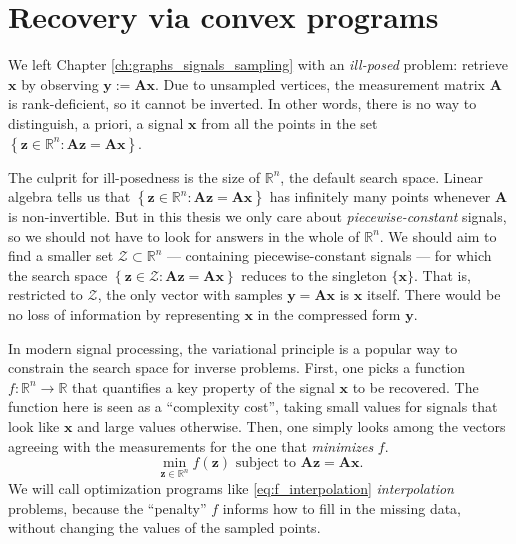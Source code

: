 \chapter{Recovery via convex programs}\label{ch:recovery_convex}

We left Chapter \ref{ch:graphs_signals_sampling} with an \emph{ill-posed} problem: retrieve $\mathbf{x}$ by observing $\mathbf{y} := \mathbf{Ax}$. Due to unsampled vertices, the measurement matrix $\mathbf{A}$ is rank-deficient, so it cannot be inverted. In other words, there is no way to distinguish, a priori, a signal $\mathbf{x}$ from all the points in the set $\left \{ \mathbf{z} \in \mathbb{R}^{n} : \mathbf{Az} = \mathbf{Ax} \right \}$.

The culprit for ill-posedness is the size of $\mathbb{R}^{n}$, the default search space. Linear algebra tells us that $\left \{ \mathbf{z} \in \mathbb{R}^{n} : \mathbf{Az} = \mathbf{Ax} \right \}$ has infinitely many points whenever $\mathbf{A}$ is non-invertible. But in this thesis we only care about \emph{piecewise-constant} signals, so we should not have to look for answers in the whole of $\mathbb{R}^{n}$. We should aim to find a smaller set $\mathcal{Z} \subset \mathbb{R}^{n}$ --- containing piecewise-constant signals --- for which the search space $\left \{ \mathbf{z} \in \mathcal{Z} : \mathbf{Az} = \mathbf{Ax} \right \}$ reduces to the singleton $\{ \mathbf{x} \}$. That is, restricted to $\mathcal{Z}$, the only vector with samples $\mathbf{y} = \mathbf{Ax}$ is $\mathbf{x}$ itself. There would be no loss of information by representing $\mathbf{x}$ in the compressed form $\mathbf{y}$.

In modern signal processing, the variational principle is a popular way to constrain the search space for inverse problems. First, one picks a function $f : \mathbb{R}^{n} \to \mathbb{R}$ that quantifies a key property of the signal $\mathbf{x}$ to be recovered. The function here is seen as a ``complexity cost'', taking small values for signals that look like $\mathbf{x}$ and large values otherwise. Then, one simply looks among the vectors agreeing with the measurements for the one that \emph{minimizes} $f$.
\begin{equation}
    \underset{\mathbf{z} \in \mathbb{R}^{n}}{\min} f(\mathbf{z}) \text{ subject to } \mathbf{Az = Ax}. \tag{P$f$} \label{eq:f_interpolation}
\end{equation}
We will call optimization programs like \eqref{eq:f_interpolation} \emph{interpolation} problems, because the ``penalty'' $f$ informs how to fill in the missing data, without changing the values of the sampled points.

